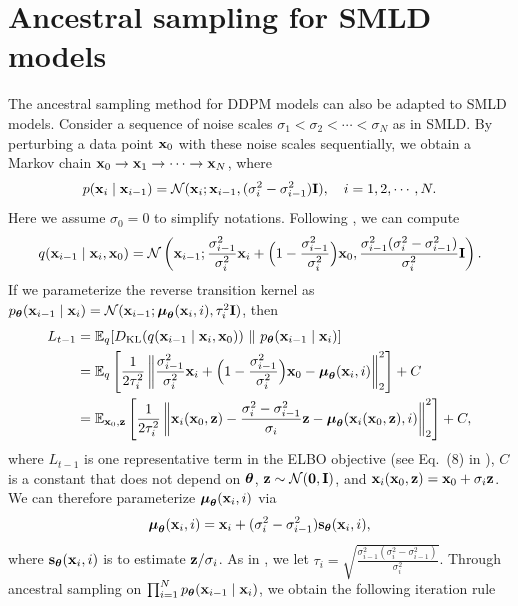 \section{Ancestral sampling for SMLD models}\label{app:ancestral}
The ancestral sampling method for DDPM models can also be adapted to SMLD models. Consider a sequence of noise scales $\sigma_1 < \sigma_2 < \cdots < \sigma_N$ as in SMLD. By perturbing a data point $\mathbf{x}_0$ with these noise scales sequentially, we obtain a Markov chain $\mathbf{x}_0 \to \mathbf{x}_1 \to \cdots \to \mathbf{x}_N$, where
\begin{align*}
    p(\mathbf{x}_i \mid \mathbf{x}_{i-1}) = \mathcal{N}(\mathbf{x}_i; \mathbf{x}_{i-1}, (\sigma_i^2 - \sigma_{i-1}^2)\mathbf{I}), \quad i=1,2,\cdots,N.
\end{align*}
Here we assume $\sigma_0 = 0$ to simplify notations. Following \citet{ho2020denoising}, we can compute
\begin{align*}
    q(\mathbf{x}_{i-1} \mid \mathbf{x}_i, \mathbf{x}_0) = \mathcal{N}\left(\mathbf{x}_{i-1}; \frac{\sigma_{i-1}^2}{\sigma_{i}^2}\mathbf{x}_i + \Big( 1 - \frac{\sigma_{i-1}^2}{\sigma_i^2} \Big)\mathbf{x}_0, \frac{\sigma_{i-1}^2 (\sigma_i^2 - \sigma_{i-1}^2)}{\sigma_i^2} \mathbf{I}  \right).
\end{align*}
If we parameterize the reverse transition kernel as $p_{\boldsymbol{\theta}}(\mathbf{x}_{i-1} \mid \mathbf{x}_i) = \mathcal{N}(\mathbf{x}_{i-1}; {\boldsymbol \mu}_{\boldsymbol{\theta}}(\mathbf{x}_i, i), \tau^2_i \mathbf{I})$, then
\begin{align*}
    L_{t-1} &= \mathbb{E}_q[D_{\text{KL}}(q(\mathbf{x}_{i-1} \mid \mathbf{x}_i, \mathbf{x}_0))~\|~p_{\boldsymbol{\theta}}(\mathbf{x}_{i-1} \mid \mathbf{x}_i)]\\
    &= \mathbb{E}_q\left[\frac{1}{2\tau^2_i} \left\lVert\frac{\sigma_{i-1}^2}{\sigma_{i}^2}\mathbf{x}_i + \Big( 1 - \frac{\sigma_{i-1}^2}{\sigma_i^2} \Big)\mathbf{x}_0 - {\boldsymbol \mu}_{\boldsymbol{\theta}}(\mathbf{x}_i, i)\right\rVert_2^2 \right] + C\\
    &=\mathbb{E}_{\mathbf{x}_0, \mathbf{z}}\left[\frac{1}{2\tau^2_i} \left\lVert\mathbf{x}_i(\mathbf{x}_0, \mathbf{z}) - \frac{\sigma_i^2 - \sigma_{i-1}^2}{\sigma_i} \mathbf{z} - {\boldsymbol \mu}_{\boldsymbol{\theta}}(\mathbf{x}_i(\mathbf{x}_0, \mathbf{z}), i)\right\rVert_2^2 \right] + C,
\end{align*}
where $L_{t-1}$ is one representative term in the ELBO objective (see Eq.~(8) in \citet{ho2020denoising}), $C$ is a constant that does not depend on ${\boldsymbol{\theta}}$, $\mathbf{z} \sim \mathcal{N}(\mathbf{0}, \mathbf{I})$, and $\mathbf{x}_i(\mathbf{x}_0, \mathbf{z}) = \mathbf{x}_0 + \sigma_i \mathbf{z}$. We can therefore parameterize ${\boldsymbol \mu}_{\boldsymbol{\theta}}(\mathbf{x}_i, i)$ via
\begin{align*}
    {\boldsymbol \mu}_{\boldsymbol{\theta}}(\mathbf{x}_i, i) = \mathbf{x}_i + (\sigma_i^2 - \sigma_{i-1}^2) \mathbf{s}_{\boldsymbol{\theta}}(\mathbf{x}_i, i),
\end{align*}
where $\mathbf{s}_{\boldsymbol{\theta}}(\mathbf{x}_i, i)$ is to estimate $\mathbf{z} / \sigma_i$. As in \citet{ho2020denoising}, we let $\tau_i = \sqrt{\frac{\sigma_{i-1}^2 (\sigma_i^2 - \sigma_{i-1}^2)}{\sigma_i^2}}$. Through ancestral sampling on $\prod_{i=1}^N p_{\boldsymbol{\theta}}(\mathbf{x}_{i-1} \mid \mathbf{x}_i)$, we obtain the following iteration rule
